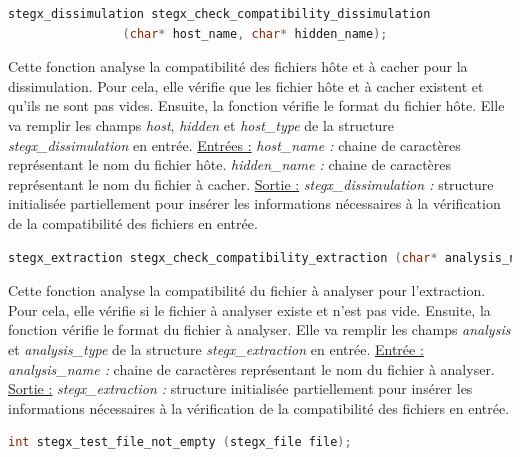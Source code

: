 \documentclass[11pt]{article}
\begin{document}
\begin{lstlisting}[language=c]
stegx_dissimulation stegx_check_compatibility_dissimulation 
                (char* host_name, char* hidden_name);
\end{lstlisting}

Cette fonction analyse la compatibilité des fichiers hôte et à cacher pour
la dissimulation. 
Pour cela, elle vérifie que les fichier hôte et à cacher existent et qu'ils 
ne sont pas vides. Ensuite, la fonction vérifie le format du fichier hôte. 
Elle va remplir les champs \textit{host}, \textit{hidden} et \textit{host\_type} 
de la structure \textit{stegx\_dissimulation} en entrée. 
\newline
\underline{Entrées :} \newline
\textit{host\_name :} chaine de caractères représentant le nom du fichier hôte. \newline
\textit{hidden\_name :} chaine de caractères représentant le nom du fichier à cacher. 
\newline
\underline{Sortie :} \newline
\textit{stegx\_dissimulation :} structure initialisée partiellement pour insérer les 
informations nécessaires à la vérification de la compatibilité des fichiers 
en entrée. 
\newline 

\begin{lstlisting}[language=c]
stegx_extraction stegx_check_compatibility_extraction (char* analysis_name);
\end{lstlisting}

Cette fonction analyse la compatibilité du fichier à analyser pour l'extraction. 
Pour cela, elle vérifie si le fichier à analyser existe et n'est pas vide. 
Ensuite, la fonction vérifie le format du fichier à analyser. 
Elle va remplir les champs \textit{analysis} et \textit{analysis\_type} 
de la structure \textit{stegx\_extraction} en entrée. 
\newline
\underline{Entrée :} \newline
\textit{analysis\_name :} chaine de caractères représentant le nom du fichier 
à analyser. \newline
\underline{Sortie :} \newline
\textit{stegx\_extraction :} structure initialisée partiellement pour insérer les 
informations nécessaires à la vérification de la compatibilité des fichiers 
en entrée. 
\newline 

\begin{lstlisting}[language=c]
int stegx_test_file_not_empty (stegx_file file);
\end{lstlisting}
\end{document}
